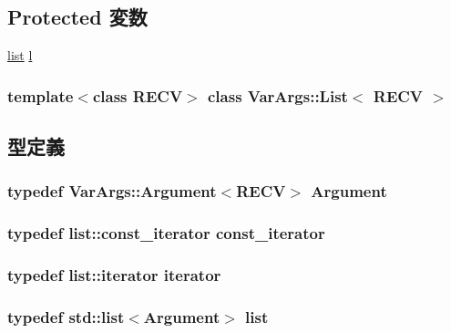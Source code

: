 \subsection*{Protected 変数}
\begin{DoxyCompactItemize}
\item 
\hyperlink{classstd_1_1list}{list} \hyperlink{classVarArgs_1_1List_ae444945db5297bdd9e5c43355c9c76a1}{l}
\end{DoxyCompactItemize}
\subsubsection*{template$<$class RECV$>$ class VarArgs::List$<$ RECV $>$}



\subsection{型定義}
\hypertarget{classVarArgs_1_1List_acff7b954174428461e00022e37040cce}{
\subsubsection[{Argument}]{\setlength{\rightskip}{0pt plus 5cm}typedef {\bf VarArgs::Argument}$<$RECV$>$ {\bf Argument}}}
\label{classVarArgs_1_1List_acff7b954174428461e00022e37040cce}
\hypertarget{classVarArgs_1_1List_afeee0934dfd283471330395273877511}{
\subsubsection[{const\_\-iterator}]{\setlength{\rightskip}{0pt plus 5cm}typedef list::const\_\-iterator {\bf const\_\-iterator}}}
\label{classVarArgs_1_1List_afeee0934dfd283471330395273877511}
\hypertarget{classVarArgs_1_1List_a7b3d64cd6c8b24e05929cb79fde1049d}{
\subsubsection[{iterator}]{\setlength{\rightskip}{0pt plus 5cm}typedef list::iterator {\bf iterator}}}
\label{classVarArgs_1_1List_a7b3d64cd6c8b24e05929cb79fde1049d}
\hypertarget{classVarArgs_1_1List_a21297939c7021f4ce84d850f600d957b}{
\subsubsection[{list}]{\setlength{\rightskip}{0pt plus 5cm}typedef {\bf std::list}$<${\bf Argument}$>$ {\bf list}}}
